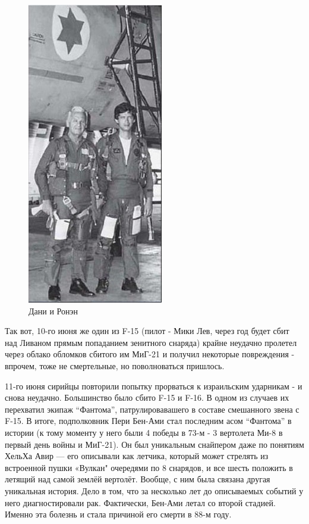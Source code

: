 \begin{figure}[h!tb] 
	\centering\includegraphics[scale=0.5]{Bekaa_3/WJuR2_4J77s.jpg}
	\caption{Дани и Ронэн}%
\end{figure}

Так вот, 10-го июня же один из F-15 (пилот - Мики Лев, через год будет сбит над Ливаном прямым попаданием зенитного снаряда) крайне неудачно пролетел через облако обломков сбитого им МиГ-21 и получил некоторые повреждения - впрочем, тоже не смертельные, но поволноваться пришлось.

11-го июня сирийцы повторили попытку прорваться к израильским ударникам - и снова неудачно. Большинство было сбито F-15 и F-16. В одном из случаев их перехватил экипаж “Фантома”, патрулировавашего в составе смешанного звена с F-15. В итоге, подполковник Пери Бен-Ами стал последним асом “Фантома” в истории (к тому моменту у него были 4 победы в 73-м - 3 вертолета Ми-8 в первый день войны и МиГ-21). Он был уникальным снайпером даже по понятиям ХельХа Авир — его описывали как летчика, который может стрелять из встроенной пушки «Вулкан" очередями по 8 снарядов, и все шесть положить в летящий над самой землёй вертолёт. Вообще, с ним была связана другая уникальная история. Дело в том, что за несколько лет до описываемых событий у него диагностировали рак. Фактически, Бен-Ами летал со второй стадией. Именно эта болезнь и стала причиной его смерти в 88-м году.

